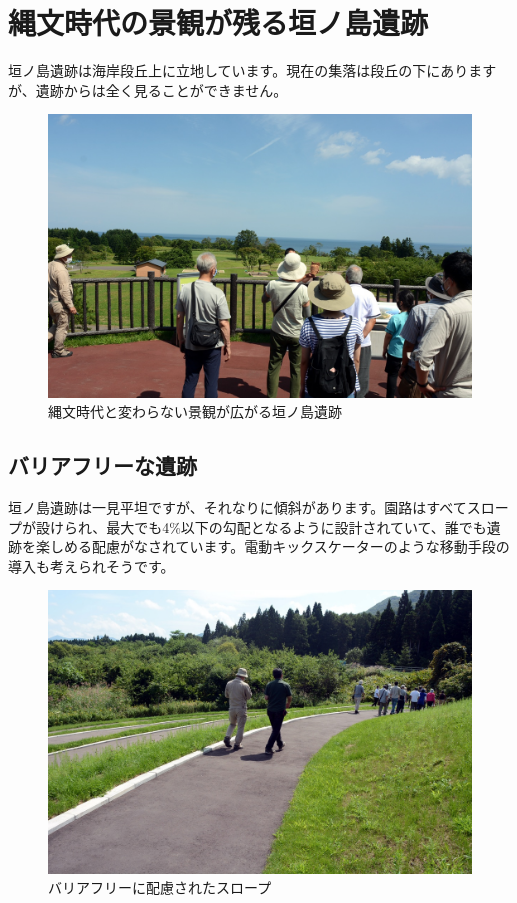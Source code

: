 \documentclass[a4j,11pt,twocolumn,openany]{jsbook}
\begin{document}
\section{縄文時代の景観が残る垣ノ島遺跡}

垣ノ島遺跡は海岸段丘上に立地しています。現在の集落は段丘の下にありますが、遺跡からは全く見ることができません。

\begin{figure}[ht]
	\centering
	\includegraphics[width=\linewidth]{fig/01_Iseki_kengaku/12_Kakinosima_zenkei.JPG}
	\caption{縄文時代と変わらない景観が広がる垣ノ島遺跡}
	\label{}
\end{figure}

\subsection{バリアフリーな遺跡}

垣ノ島遺跡は一見平坦ですが、それなりに傾斜があります。園路はすべてスロープが設けられ、最大でも4\%以下の勾配となるように設計されていて、誰でも遺跡を楽しめる配慮がなされています。電動キックスケーターのような移動手段の導入も考えられそうです。

\begin{figure}[ht]
	\centering
	\includegraphics[width=\linewidth]{fig/01_Iseki_kengaku/13Kakinosima_slope.JPG}
	\caption{バリアフリーに配慮されたスロープ}
	\label{}
\end{figure}
\end{document}
